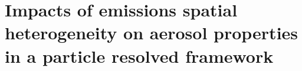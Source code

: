 \chapter{Impacts of emissions spatial heterogeneity on aerosol properties in a particle resolved framework}